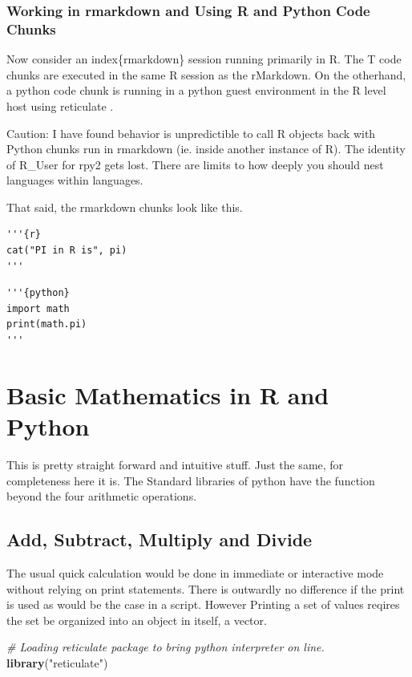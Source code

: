 \documentclass[]{book}
\newenvironment{Shaded}{\begin{snugshade}}{\end{snugshade}}
\newcommand{\KeywordTok}[1]{\textcolor[rgb]{0.13,0.29,0.53}{\textbf{#1}}}
\newcommand{\StringTok}[1]{\textcolor[rgb]{0.31,0.60,0.02}{#1}}
\newcommand{\CommentTok}[1]{\textcolor[rgb]{0.56,0.35,0.01}{\textit{#1}}}
\newcommand{\NormalTok}[1]{#1}
\theoremstyle{definition}
\theoremstyle{definition}
\theoremstyle{definition}
\theoremstyle{remark}
\begin{document}
\subsection{Working in rmarkdown and Using R and Python Code
Chunks}\label{working-in-rmarkdown-and-using-r-and-python-code-chunks}

Now consider an index\{rmarkdown\} session running primarily in R. The T
code chunks are executed in the same R session as the rMarkdown. On the
otherhand, a python code chunk is running in a python guest environment
in the R level host using reticulate .

Caution: I have found behavior is unpredictible to call R objects back
with Python chunks run in rmarkdown (ie. inside another instance of R).
The identity of R\_User for rpy2 gets lost. There are limits to how
deeply you should nest languages within languages.

That said, the rmarkdown chunks look like this.

\begin{verbatim}
'''{r}
cat("PI in R is", pi)
'''
\end{verbatim}

\begin{verbatim}
'''{python}
import math
print(math.pi)
'''
\end{verbatim}

\chapter{Basic Mathematics in R and
Python}\label{basic-mathematics-in-r-and-python}

This is pretty straight forward and intuitive stuff. Just the same, for
completeness here it is. The Standard libraries of python have the
function beyond the four arithmetic operations.

\section{Add, Subtract, Multiply and
Divide}\label{add-subtract-multiply-and-divide}

 The usual quick calculation would be done in immediate or
interactive mode without relying on print statements. There is outwardly
no difference if the print is used as would be the case in a script.
However Printing a set of values reqires the set be organized into an
object in itself, a vector.

\begin{Shaded}
\begin{Highlighting}[]
\CommentTok{# Loading reticulate package to bring python interpreter on line.}
\KeywordTok{library}\NormalTok{(}\StringTok{"reticulate"}\NormalTok{)}
\end{Highlighting}
\end{Shaded}
\end{document}
